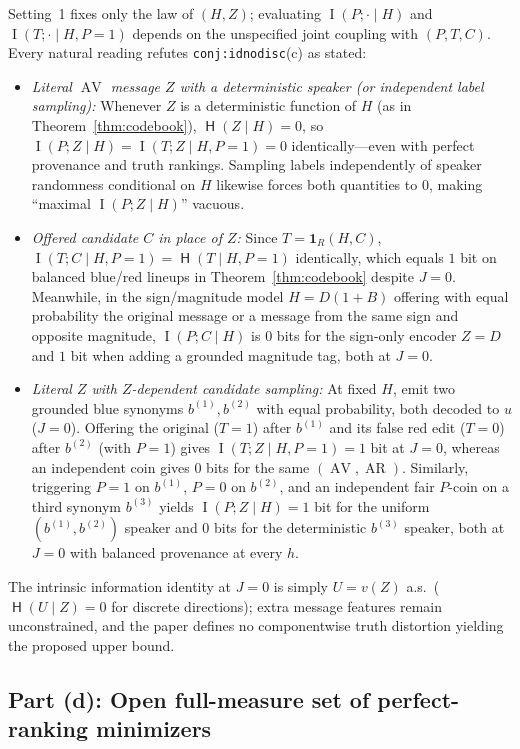 \documentclass[11pt]{article}
\theoremstyle{plain}
\theoremstyle{definition}
\theoremstyle{remark}
\DeclareMathOperator{\AV}{AV}
\DeclareMathOperator{\AR}{AR}
\DeclareMathOperator{\MI}{I}
\DeclareMathOperator{\Ent}{\mathsf{H}}
\begin{document}
Setting~1 fixes only the law of $(H, Z)$; evaluating $\MI(P; \cdot \mid H)$ and $\MI(T; \cdot \mid H, P=1)$ depends on the unspecified joint coupling with $(P, T, C)$. Every natural reading refutes \texttt{conj:idnodisc}(c) as stated:
\begin{itemize}[leftmargin=2em,itemsep=2pt]
\item \emph{Literal $\AV$ message $Z$ with a deterministic speaker (or independent label sampling):} Whenever $Z$ is a deterministic function of $H$ (as in Theorem~\ref{thm:codebook}), $\Ent(Z \mid H) = 0$, so $\MI(P; Z \mid H) = \MI(T; Z \mid H, P=1) = 0$ identically---even with perfect provenance and truth rankings. Sampling labels independently of speaker randomness conditional on $H$ likewise forces both quantities to $0$, making ``maximal $\MI(P; Z \mid H)$'' vacuous.
\item \emph{Offered candidate $C$ in place of $Z$:} Since $T = \mathbf{1}_R(H, C)$, $\MI(T; C \mid H, P=1) = \Ent(T \mid H, P=1)$ identically, which equals $1$ bit on balanced blue/red lineups in Theorem~\ref{thm:codebook} despite $J = 0$. Meanwhile, in the sign/magnitude model $H = D(1 + B)$ offering with equal probability the original message or a message from the same sign and opposite magnitude, $\MI(P; C \mid H)$ is $0$ bits for the sign-only encoder $Z = D$ and $1$ bit when adding a grounded magnitude tag, both at $J = 0$.
\item \emph{Literal $Z$ with $Z$-dependent candidate sampling:} At fixed $H$, emit two grounded blue synonyms $b^{(1)}, b^{(2)}$ with equal probability, both decoded to $u$ ($J = 0$). Offering the original ($T = 1$) after $b^{(1)}$ and its false red edit ($T = 0$) after $b^{(2)}$ (with $P = 1$) gives $\MI(T; Z \mid H, P = 1) = 1$ bit at $J = 0$, whereas an independent coin gives $0$ bits for the same $(\AV, \AR)$. Similarly, triggering $P = 1$ on $b^{(1)}$, $P = 0$ on $b^{(2)}$, and an independent fair $P$-coin on a third synonym $b^{(3)}$ yields $\MI(P; Z \mid H) = 1$ bit for the uniform $(b^{(1)}, b^{(2)})$ speaker and $0$ bits for the deterministic $b^{(3)}$ speaker, both at $J = 0$ with balanced provenance at every $h$.
\end{itemize}
The intrinsic information identity at $J = 0$ is simply $U = v(Z)$ a.s.\ ($\Ent(U \mid Z) = 0$ for discrete directions); extra message features remain unconstrained, and the paper defines no componentwise truth distortion yielding the proposed upper bound.

\subsection{Part (d): Open full-measure set of perfect-ranking minimizers}
\end{document}
